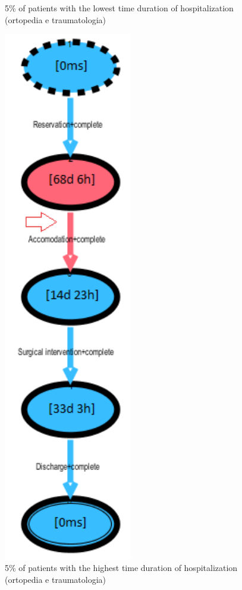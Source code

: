 \begin{figure} [htbp]
\begin{minipage}[t]{0.3\textwidth}
\caption{5\% of patients with the lowest time duration of hospitalization (ortopedia e traumatologia)}
\end{minipage}
\begin{minipage}[t]{0.3\textwidth}
\includegraphics[width=0.5\textwidth]{RicoveriTransitionSystemSojourn3601Slow}
\caption{5\% of patients with the highest time duration of hospitalization (ortopedia e traumatologia)}
\end{minipage}
\end{figure}\\

